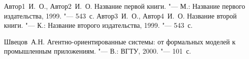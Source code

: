 \begin{thebibliography}{99}
\bibitem{} Автор1~И.~О., Автор2~И.~О. Название первой книги. "--- М.:
Название первого издательства, 1999. "--- 543~с.
\bibitem{} Автор3~И.~О., Автор4~И.~О. Название второй книги. "--- К.:
Название второго издательства, 1999. "--- 543~с.

\bibitem{} Швецов~А.Н. Агентно-ориентированные системы: от формальных моделей к промышленным приложениям. "--- В.:
ВГТУ, 2000. "--- 101~с.
\end{thebibliography}
